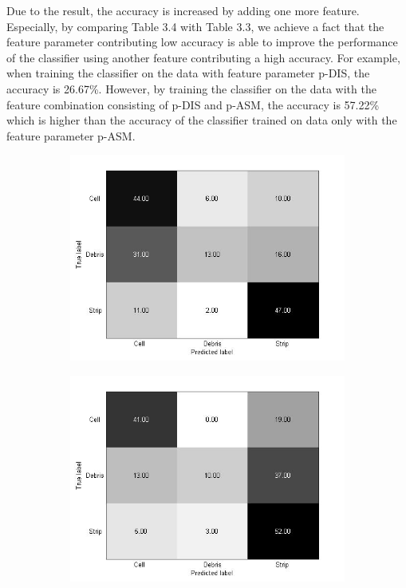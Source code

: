 Due to the result, the accuracy is increased by adding one more feature. Especially, by comparing Table 3.4 with Table 3.3, we achieve a fact that the feature parameter contributing low accuracy is able to improve the performance of the classifier using another feature contributing a high accuracy. For example, when training the classifier on the data with feature parameter p-DIS, the accuracy is 26.67\%. However, by training the classifier on the data with the feature combination consisting of p-DIS and p-ASM, the accuracy is 57.22\% which is higher than the accuracy of the classifier trained on data only with the feature parameter p-ASM. 
\begin{figure}[!h]
\centering
  \begin{subfigure}[b]{0.3\textwidth}
    \includegraphics[width=\textwidth]{confusion_matrix/fig3_3_a.jpg}
    \caption{}
  \end{subfigure}
  \begin{subfigure}[b]{0.3\textwidth}
    \includegraphics[width=\textwidth]{confusion_matrix/fig3_3_b.jpg}

\end{subfigure}
\end{figure}
